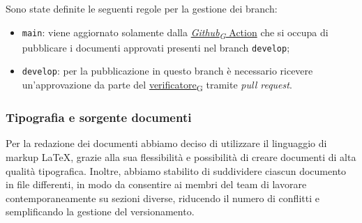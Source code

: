 Sono state definite le seguenti regole per la gestione dei branch:
\begin{itemize}
	\item \texttt{main}: viene aggiornato solamente dalla \href{https://7last.github.io/docs/rtb/documentazione-interna/glossario\#github}{\textit{Github\textsubscript{G}} Action} che si occupa di pubblicare i documenti approvati presenti nel branch \texttt{develop};
	\item \texttt{develop}: per la pubblicazione in questo branch è necessario ricevere un'approvazione da parte del \href{https://7last.github.io/docs/rtb/documentazione-interna/glossario\#verificatore}{verificatore\textsubscript{G}} tramite \textit{pull request}.
\end{itemize}

\subsubsection{Tipografia e sorgente documenti}
Per la redazione dei documenti abbiamo deciso di utilizzare il linguaggio di markup LaTeX, grazie alla sua flessibilità e possibilità di creare documenti di alta qualità tipografica.
Inoltre, abbiamo stabilito di suddividere ciascun documento in file differenti, in modo da consentire ai membri del team di lavorare contemporaneamente su sezioni diverse,
riducendo il numero di conflitti e semplificando la gestione del versionamento.

